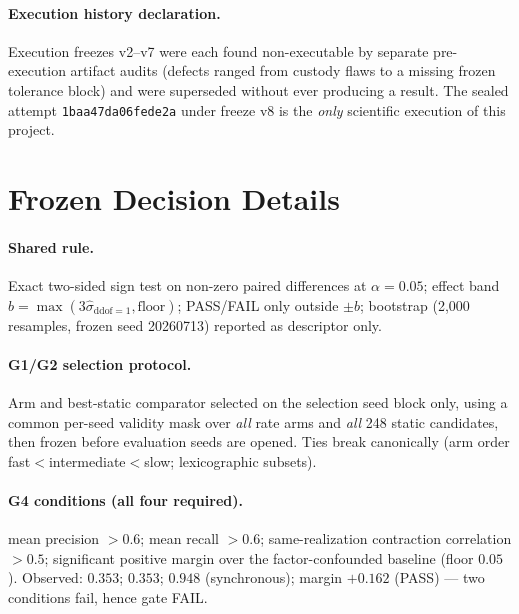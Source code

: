 \documentclass[11pt]{article}
\begin{document}
\paragraph{Execution history declaration.}
Execution freezes v2--v7 were each found non-executable by separate
pre-execution artifact audits (defects ranged from custody flaws to a missing
frozen tolerance block) and were superseded without ever producing a result. The
sealed attempt \texttt{1baa47da06fede2a} under freeze v8 is the \emph{only}
scientific execution of this project.

\section{Frozen Decision Details}
\label{app:decisions}

\paragraph{Shared rule.} Exact two-sided sign test on non-zero paired
differences at $\alpha=0.05$; effect band
$b=\max(3\hat{\sigma}_{\mathrm{ddof}=1},\text{floor})$; PASS/FAIL only outside
$\pm b$; bootstrap (2{,}000 resamples, frozen seed 20260713) reported as
descriptor only.

\paragraph{G1/G2 selection protocol.} Arm and best-static comparator selected
on the selection seed block only, using a common per-seed validity mask over
\emph{all} rate arms and \emph{all} 248 static candidates, then frozen before
evaluation seeds are opened. Ties break canonically (arm order
fast$<$intermediate$<$slow; lexicographic subsets).

\paragraph{G4 conditions (all four required).} mean precision $>0.6$;
mean recall $>0.6$; same-realization contraction correlation $>0.5$;
significant positive margin over the factor-confounded baseline (floor
$0.05$). Observed: $0.353$; $0.353$; $0.948$ (synchronous); margin $+0.162$
(PASS) --- two conditions fail, hence gate FAIL.



\end{document}
